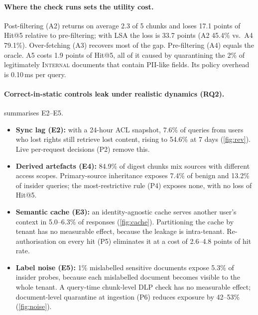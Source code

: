 \documentclass[10pt]{article}
\begin{document}
\paragraph{Where the check runs sets the utility cost.}
Post-filtering (A2) returns on average 2.3 of 5 chunks and loses 17.1 points of Hit@5 relative to pre-filtering; with LSA the loss is 33.7 points (A2 45.4\% vs.\ A4 79.1\%). Over-fetching (A3) recovers most of the gap. Pre-filtering (A4) equals the oracle. A5 costs 1.9 points of Hit@5, all of it caused by quarantining the 2\% of legitimately \textsc{Internal} documents that contain PII-like fields. Its policy overhead is 0.10\,ms per query.

\paragraph{Correct-in-static controls leak under realistic dynamics (RQ2).}
 summarises E2--E5.
\begin{itemize}\itemsep0pt
\item \textbf{Sync lag (E2):} with a 24-hour ACL snapshot, 7.6\% of queries from users who lost rights still retrieve lost content, rising to 54.6\% at 7 days (\cref{fig:rev}). Live per-request decisions (P2) remove this.
\item \textbf{Derived artefacts (E4):} 84.9\% of digest chunks mix sources with different access scopes. Primary-source inheritance exposes 7.4\% of benign and 13.2\% of insider queries; the most-restrictive rule (P4) exposes none, with no loss of Hit@5.
\item \textbf{Semantic cache (E3):} an identity-agnostic cache serves another user's context in 5.0--6.3\% of responses (\cref{fig:cache}). Partitioning the cache by tenant has no measurable effect, because the leakage is intra-tenant. Re-authorisation on every hit (P5) eliminates it at a cost of 2.6--4.8 points of hit rate.
\item \textbf{Label noise (E5):} 1\% mislabelled sensitive documents expose 5.3\% of insider probes, because each mislabelled document becomes visible to the whole tenant. A query-time chunk-level DLP check has no measurable effect; document-level quarantine at ingestion (P6) reduces exposure by 42--53\% (\cref{fig:noise}).
\end{itemize}
\end{document}
